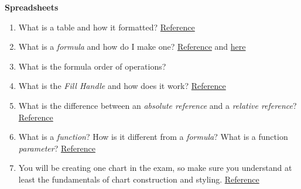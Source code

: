 \documentclass[a4paper, 11pt]{article}
\begin{document}
\large\textbf{Spreadsheets}
\begin{enumerate}
    \item What is a table and how it formatted? \href{https://itech.erickuha.com/book/ch4-spreadsheets/tutorial2-formatting.html}{\textcolor{linkblue}{Reference}}
    \item What is a \textit{formula} and how do I make one? \href{https://itech.erickuha.com/book/ch4-spreadsheets/tutorial1-2.html}{\textcolor{linkblue}{Reference}} and \href{https://itech.erickuha.com/book/ch4-spreadsheets/exercises1-formulas.html}{\textcolor{linkblue}{here}}
    \item What is the formula order of operations?
    \item What is the \textit{Fill Handle} and how does it work? \href{https://itech.erickuha.com/book/ch4-spreadsheets/tutorial-references.html}{\textcolor{linkblue}{Reference}}
    \item What is the difference between an \textit{absolute reference} and a \textit{relative reference}? \href{https://itech.erickuha.com/book/ch4-spreadsheets/tutorial-references.html}{\textcolor{linkblue}{Reference}}
    \item What is a \textit{function}? How is it different from a \textit{formula}? What is a function \textit{parameter}? \href{https://itech.erickuha.com/book/ch4-spreadsheets/tutorial-functions-charts.html}{\textcolor{linkblue}{Reference}}
    \item You will be creating one chart in the exam, so make sure you understand at least the fundamentals of chart construction and styling. \href{https://itech.erickuha.com/book/ch4-spreadsheets/tutorial-functions-charts.html}{\textcolor{linkblue}{Reference}}
\end{enumerate}
\end{document}

